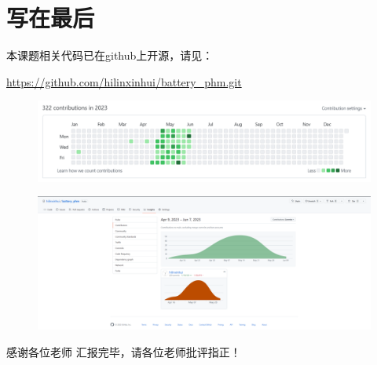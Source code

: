 \documentclass{beamer}
\begin{document}
\section{写在最后}

\begin{frame}
	\centering
	本课题相关代码已在github上开源，请见：

	\centering
	\url {https://github.com/hilinxinhui/battery_phm.git}

	\begin{figure}[htbp]
		\centering
		\includegraphics[scale=0.35]{figures/github_contribution_log.png}
	\end{figure}

	\begin{figure}[htbp]
		\centering
		\includegraphics[scale=0.15]{figures/github_contribution_log_2.png}
	\end{figure}

\end{frame}

\begin{frame}{感谢各位老师}
	\LARGE \centering 汇报完毕，请各位老师批评指正！
\end{frame}
\end{document}
